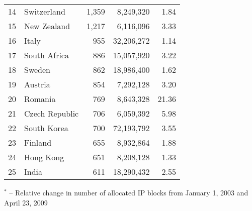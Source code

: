 \begin{table*}[p]
\begin{minipage}[t]{0.48\textwidth}
\begin{center}
\begin{tabular}{|l||l|r|r|r|}
14      &       Switzerland     &       1,359   &       8,249,320       &         1.84  \tabularnewline
15      &       New Zealand     &       1,217   &       6,116,096       &         3.33  \tabularnewline
16      &       Italy   &       955     &       32,206,272      &         1.14  \tabularnewline
17      &       South Africa    &       886     &       15,057,920      &         3.22  \tabularnewline
18      &       Sweden  &       862     &       18,986,400      &         1.62  \tabularnewline
19      &       Austria &       854     &       7,292,128       &         3.20  \tabularnewline
20      &       Romania &       769     &       8,643,328       &        21.36  \tabularnewline
21      &       Czech Republic  &       706     &       6,059,392       &         5.98  \tabularnewline
22      &       South Korea     &       700     &       72,193,792      &         3.55  \tabularnewline
23      &       Finland &       655     &       8,932,864       &         1.88  \tabularnewline
24      &       Hong Kong       &       651     &       8,208,128       &         1.33  \tabularnewline
25      &       India   &       611     &       18,290,432      &         2.55  \tabularnewline
	\hline
	\end{tabular}
	\end{center}

	\small	$^{*}$ -- Relative change in number of allocated IP blocks from January 1, 2003 and April 23, 2009
\end{minipage}

\vspace{1cm}


\end{table*}
